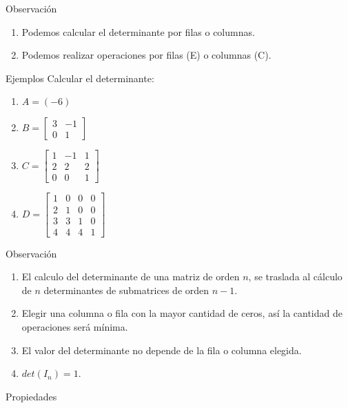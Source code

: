 {Observación}

\begin{enumerate}
\item
Podemos calcular el determinante por filas o columnas.
\item
Podemos realizar operaciones por filas (E) o columnas (C).
\end{enumerate}


{Ejemplos}
Calcular el determinante:

\begin{enumerate}
\item
$A=(-6)$
\item
$B= \begin{bmatrix}
3 &  -1 \\
0 &  1
\end{bmatrix}
$
\item
$C= \begin{bmatrix}
1 &  -1 & 1 \\
2 &  2 & 2\\
0 &  0 &  1
\end{bmatrix}
$
\item
$D= \begin{bmatrix}
1 &  0 & 0  & 0 \\
2 &  1 & 0  & 0\\
3 &  3 &1  & 0\\
4 &  4 &4  & 1
\end{bmatrix}
$
\end{enumerate}


{Observación}

\begin{enumerate}
\item
El calculo del determinante de una matriz de orden $n$, se traslada al cálculo de $n$ determinantes de submatrices de orden $n-1$. 
\item
Elegir una columna o fila con la mayor cantidad de ceros, así la cantidad de operaciones será mínima.
\item
El valor del determinante no depende de la fila o columna elegida.
\item
$det(I_n) = 1$.
\end{enumerate}


{Propiedades}

